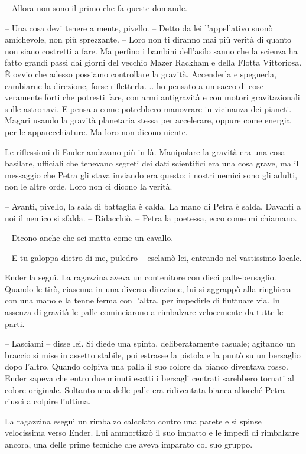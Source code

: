 {-- Allora non sono il primo che fa queste domande.}

{-- Una cosa devi tenere a mente, pivello. -- Detto da lei l'appellativo
	suonò amichevole, non più sprezzante. -- Loro non ti diranno mai più
	verità di quanto non siano costretti a fare. Ma perfino i bambini
	dell'asilo sanno che la scienza ha fatto grandi passi dai giorni del
	vecchio Mazer Rackham e della Flotta Vittoriosa. È ovvio che adesso
	possiamo controllare la gravità. Accenderla e spegnerla, cambiarne la
	direzione, forse rifletterla. .. ho pensato a un sacco di cose veramente
	forti che potresti fare, con armi antigravità e con motori
	gravitazionali sulle astronavi. E pensa a come potrebbero manovrare in
	vicinanza dei pianeti. Magari usando la gravità planetaria stessa per
	accelerare, oppure come energia per le apparecchiature. Ma loro non
	dicono niente.}

{Le riflessioni di Ender andavano più in là. Manipolare la gravità era
	una cosa basilare, ufficiali che tenevano segreti dei dati scientifici
	era una cosa grave, ma il messaggio che Petra gli stava inviando era
	questo: i nostri nemici sono gli adulti, non le altre orde. Loro non ci
	dicono la verità.}

{-- Avanti, pivello, la sala di battaglia è calda. La mano di Petra è
	salda. Davanti a noi il nemico si sfalda. -- Ridacchiò. -- Petra la
	poetessa, ecco come mi chiamano.}

{-- Dicono anche che sei matta come un cavallo.}

{-- E tu galoppa dietro di me, puledro -- esclamò lei, entrando nel
	vastissimo locale.}

{Ender la seguì. La ragazzina aveva un contenitore con dieci
	palle-bersaglio. Quando le tirò, ciascuna in una diversa direzione, lui
	si aggrappò alla ringhiera con una mano e la tenne ferma con l'altra,
	per impedirle di fluttuare via. In assenza di gravità le palle
	cominciarono a rimbalzare velocemente da tutte le parti.}

{-- Lasciami -- disse lei. Si diede una spinta, deliberatamente casuale;
	agitando un braccio si mise in assetto stabile, poi estrasse la pistola
	e la puntò su un bersaglio dopo l'altro. Quando colpiva una palla il suo
	colore da bianco diventava rosso. Ender sapeva che entro due minuti
	esatti i bersagli centrati sarebbero tornati al colore originale.
	Soltanto una delle palle era ridiventata bianca allorché Petra riuscì a
	colpire l'ultima.}

{La ragazzina eseguì un rimbalzo calcolato contro una parete e si spinse
	velocissima verso Ender. Lui ammortizzò il suo impatto e le impedì di
	rimbalzare ancora, una delle prime tecniche che aveva imparato col suo
	gruppo.}

